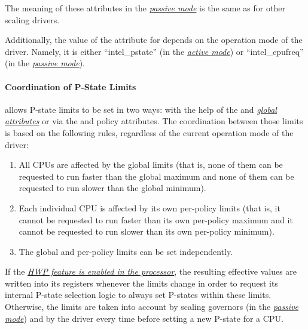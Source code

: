 \documentclass[a4paper,8pt,english]{sphinxmanual}
\begin{document}
The meaning of these attributes in the {\hyperref[admin\string-guide/pm/intel_pstate:passive\string-mode]{\emph{passive mode}}}\label{admin-guide/pm/intel_pstate:passive-mode} is the
same as for other scaling drivers.

Additionally, the value of the  attribute for 
depends on the operation mode of the driver.  Namely, it is either
``intel\_pstate'' (in the {\hyperref[admin\string-guide/pm/intel_pstate:active\string-mode]{\emph{active mode}}}\label{admin-guide/pm/intel_pstate:active-mode}) or ``intel\_cpufreq'' (in the
{\hyperref[admin\string-guide/pm/intel_pstate:passive\string-mode]{\emph{passive mode}}}\label{admin-guide/pm/intel_pstate:passive-mode}).


\paragraph{Coordination of P-State Limits}
\label{admin-guide/pm/intel_pstate:coordination-of-p-state-limits}
 allows P-state limits to be set in two ways: with the help of
the  and  {\hyperref[admin\string-guide/pm/intel_pstate:global\string-attributes]{\emph{global attributes}}}\label{admin-guide/pm/intel_pstate:global-attributes} or via the  and 
 policy attributes.  The coordination between those limits is based
on the following rules, regardless of the current operation mode of the driver:
\begin{enumerate}
\item {} 
All CPUs are affected by the global limits (that is, none of them can be
requested to run faster than the global maximum and none of them can be
requested to run slower than the global minimum).

\item {} 
Each individual CPU is affected by its own per-policy limits (that is, it
cannot be requested to run faster than its own per-policy maximum and it
cannot be requested to run slower than its own per-policy minimum).

\item {} 
The global and per-policy limits can be set independently.

\end{enumerate}

If the {\hyperref[admin\string-guide/pm/intel_pstate:active\string-mode\string-with\string-hwp]{\emph{HWP feature is enabled in the processor}}}\label{admin-guide/pm/intel_pstate:active-mode-with-hwp}, the
resulting effective values are written into its registers whenever the limits
change in order to request its internal P-state selection logic to always set
P-states within these limits.  Otherwise, the limits are taken into account by
scaling governors (in the {\hyperref[admin\string-guide/pm/intel_pstate:passive\string-mode]{\emph{passive mode}}}\label{admin-guide/pm/intel_pstate:passive-mode}) and by the driver
every time before setting a new P-state for a CPU.
\end{document}
